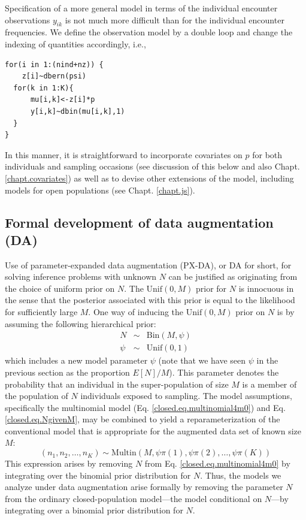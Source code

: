 Specification of a more general model in terms of the individual
encounter observations $y_{ik}$ is not much more difficult than for
the individual encounter frequencies.  We define the
observation model by a double loop and change the indexing of quantities
accordingly, i.e.,
{\small
\begin{verbatim}
for(i in 1:(nind+nz)) {
    z[i]~dbern(psi)
  for(k in 1:K){
      mu[i,k]<-z[i]*p
      y[i,k]~dbin(mu[i,k],1)
  }
}
\end{verbatim}
}
In this manner, it is straightforward to incorporate covariates on $p$
for both individuals and sampling occasions
(see discussion of this below and also Chapt. \ref{chapt.covariates})
as well as to devise other extensions of the model, including models
for open populations (see Chapt. \ref{chapt.js}).

\subsection{Formal development of data augmentation (DA) }

Use of parameter-expanded data augmentation (PX-DA), or DA for short, for solving inference problems with unknown $N$ can be
justified as originating from the choice of uniform prior on $N$.  The
$\mathrm{Unif}(0,M)$ prior for $N$ is innocuous in the sense that the
posterior associated with this prior is equal to the likelihood for
sufficiently large $M$.  One way of inducing the $\mathrm{Unif}(0,M)$
prior on $N$ is by assuming the following hierarchical prior:
\begin{eqnarray}
\label{closed.eq.NgivenM}
  N &\sim& \mathrm{Bin}(M, \psi) \\ \nonumber
  \psi &\sim& \mathrm{Unif}(0,1)
\end{eqnarray}
which includes a new model parameter $\psi$
(note that we have seen $\psi$ in the previous section as the proportion $E[N]/M$).
This parameter denotes
the probability that an individual in the super-population of size $M$
is a member of the population of $N$ individuals exposed to sampling.
The model assumptions, specifically the multinomial model
(Eq. \ref{closed.eq.multinomial4m0})
and Eq. \ref{closed.eq.NgivenM}, may be combined to yield a
reparameterization of the conventional model that is appropriate for
the augmented data set of known size $M$:
\begin{equation}
\label{closed.eq.multinomial4DA}
    (n_1, n_2, \ldots, n_K) \sim \mathrm{Multin}(M, \psi  \pi(1), \psi \pi(2), \ldots, \psi \pi(K))
\end{equation}
This expression arises by removing $N$ from Eq. \ref{closed.eq.multinomial4m0} by
integrating
over the binomial prior distribution for $N$. Thus, the models we
analyze under data augmentation arise formally by removing the
parameter $N$ from the ordinary closed-population model---the model
conditional on $N$---by integrating over a binomial prior distribution
for $N$.

